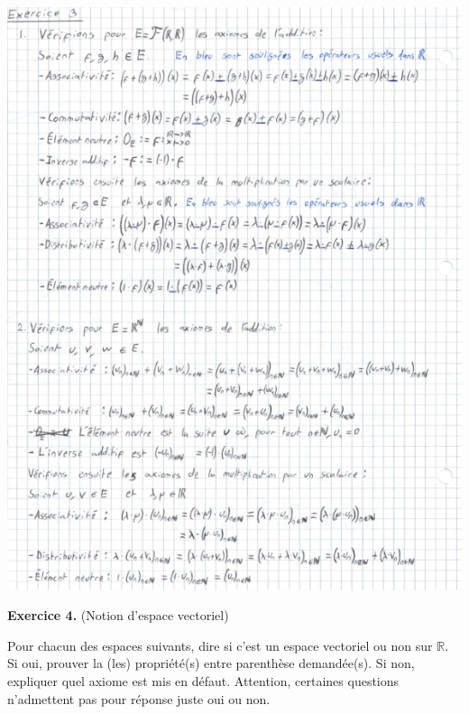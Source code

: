 \documentclass[a4paper, 10pt]{report}
\begin{document}
	\includegraphics{ex03.png}

	\vspace{5mm}
	\noindent
	\textbf{Exercice 4.} (Notion d'espace vectoriel)
	
	\indent Pour chacun des espaces suivants, dire si c'est un espace
	vectoriel ou non sur $\mathbb{R}$. Si oui, prouver la (les)
	propriété(s) entre parenthèse demandée(s). Si non, expliquer quel
	axiome est mis en défaut. Attention, certaines questions
	n'admettent pas pour réponse juste oui ou non.
	
\end{document}
